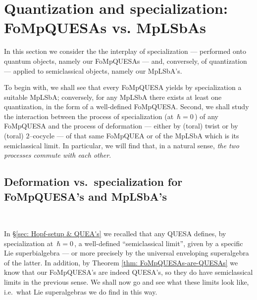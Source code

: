 \documentclass[12pt,reqno,twoside,a4paper]{amsart}
\numberwithin{equation}{section}
\theoremstyle{definition}
\newtheorem{free text}[lema]{}
\theoremstyle{remark}
\theoremstyle{plain}
\begin{document}
\section{Quantization and specialization: FoMpQUESAs vs. MpLSbAs}  \label{sec: FoMpQUESA's-vs-MpLSbA's}
%
 \vskip7pt
%
%
 \vskip1pt
%
   In this section we consider the the interplay of specialization
   --- performed onto quantum objects, namely our FoMpQUESAs ---
   and, conversely, of quantization   --- applied to semiclassical objects, namely our MpLSbA's.
                                                                \par
   To begin with, we shall see that every FoMpQUESA yields by
   specialization a suitable MpLSbA; conversely, for any MpLSbA
   there exists at least one quantization, in the form of a well-defined FoMpQUESA.
   Second, we shall study the interaction between the process of specialization (at  $ \, \hbar = 0 \, $)
   of any FoMpQUESA and the process of deformation
   --- either by (toral) twist or by (toral)  $ 2 $--cocycle  ---
   of that same FoMpQUEA or of the MpLSbA which is its semiclassical limit.
   In particular, we will find that, in a natural sense,
   \textsl{the two processes commute with each other}.

\medskip

\subsection{Deformation vs.\ specialization for FoMpQUESA's and MpLSbA's}
\label{subsec: def-vs.-spec-x-FoMpQUESA's&MpLSbA's} {\ }

\medskip

   In  \S \ref{sec: Hopf-setup & QUEA's}  we recalled that any QUESA defines,
   by specialization at  $ \, \hbar = 0 \, $,  a well-defined ``semiclassical limit'',
   given by a specific Lie superbialgebra   --- or more precisely by the universal
   enveloping superalgebra of the latter.  In addition, by
   Theorem \ref{thm: FoMpQUESAs-are-QUESAs}  we know that our FoMpQUESA's are
   indeed QUESA's, so they do have semiclassical limits in the previous sense.
   We shall now go and see what these limits look like, i.e.\ what Lie superalgebras we do find in this way.

\vskip11pt
\end{document}
